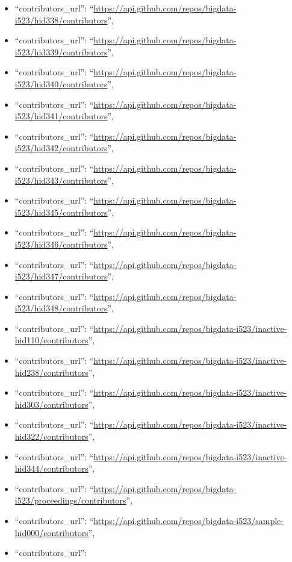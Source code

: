 \begin{itemize}
\item
  ``contributors\_url'':
  ``\url{https://api.github.com/repos/bigdata-i523/hid338/contributors}'',
\item
  ``contributors\_url'':
  ``\url{https://api.github.com/repos/bigdata-i523/hid339/contributors}'',
\item
  ``contributors\_url'':
  ``\url{https://api.github.com/repos/bigdata-i523/hid340/contributors}'',
\item
  ``contributors\_url'':
  ``\url{https://api.github.com/repos/bigdata-i523/hid341/contributors}'',
\item
  ``contributors\_url'':
  ``\url{https://api.github.com/repos/bigdata-i523/hid342/contributors}'',
\item
  ``contributors\_url'':
  ``\url{https://api.github.com/repos/bigdata-i523/hid343/contributors}'',
\item
  ``contributors\_url'':
  ``\url{https://api.github.com/repos/bigdata-i523/hid345/contributors}'',
\item
  ``contributors\_url'':
  ``\url{https://api.github.com/repos/bigdata-i523/hid346/contributors}'',
\item
  ``contributors\_url'':
  ``\url{https://api.github.com/repos/bigdata-i523/hid347/contributors}'',
\item
  ``contributors\_url'':
  ``\url{https://api.github.com/repos/bigdata-i523/hid348/contributors}'',
\item
  ``contributors\_url'':
  ``\url{https://api.github.com/repos/bigdata-i523/inactive-hid110/contributors}'',
\item
  ``contributors\_url'':
  ``\url{https://api.github.com/repos/bigdata-i523/inactive-hid238/contributors}'',
\item
  ``contributors\_url'':
  ``\url{https://api.github.com/repos/bigdata-i523/inactive-hid303/contributors}'',
\item
  ``contributors\_url'':
  ``\url{https://api.github.com/repos/bigdata-i523/inactive-hid322/contributors}'',
\item
  ``contributors\_url'':
  ``\url{https://api.github.com/repos/bigdata-i523/inactive-hid344/contributors}'',
\item
  ``contributors\_url'':
  ``\url{https://api.github.com/repos/bigdata-i523/proceedings/contributors}'',
\item
  ``contributors\_url'':
  ``\url{https://api.github.com/repos/bigdata-i523/sample-hid000/contributors}'',
\item
  ``contributors\_url'':

\end{itemize}
